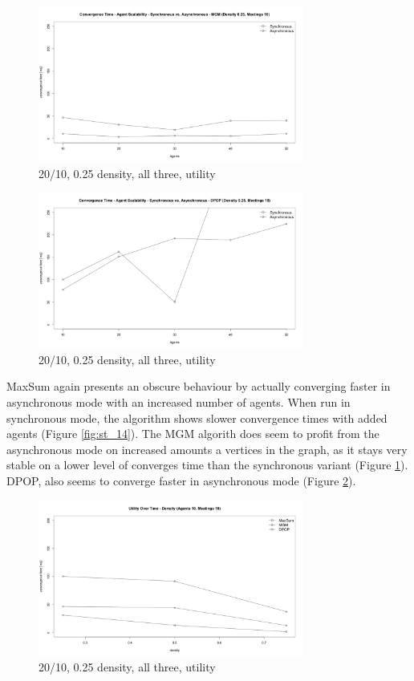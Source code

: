 \begin{figure}[H]
\centering
\includegraphics[width=330px]{graphics/experiments/static/st_15}
\caption{20/10, 0.25 density, all three, utility}
\label{fig:st_15}
\end{figure}

\begin{figure}[H]
\centering
\includegraphics[width=330px]{graphics/experiments/static/st_16}
\caption{20/10, 0.25 density, all three, utility}
\label{fig:st_16}
\end{figure}

MaxSum again presents an obscure behaviour by actually converging faster in asynchronous mode with an increased number of agents. When run in synchronous mode, the algorithm shows slower convergence times with added agents (Figure \ref{fig:st_14}). The MGM algorith does seem to profit from the asynchronous mode on increased amounts a vertices in the graph, as it stays very stable on a lower level of converges time than the synchronous variant (Figure \ref{fig:st_15}). DPOP, also seems to converge faster in asynchronous mode (Figure \ref{fig:st_16}).

\begin{figure}[H]
\centering
\includegraphics[width=330px]{graphics/experiments/static/st_17}
\caption{20/10, 0.25 density, all three, utility}
\label{fig:st_17}
\end{figure}

